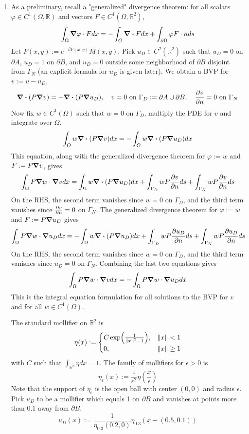 \documentclass{article}
\def\mbb#1{\mathbb{#1}}
\def\bR{\mbb{R}}
\newcommand{\br}[1]{\left(#1\right)}
\newcommand{\e}{\epsilon}
\newcommand{\vp}{\varphi}
\renewcommand{\d}{\partial}
\renewcommand{\O}{\Omega}
\newcommand{\G}{\Gamma}
\begin{document}
\begin{enumerate}
\begin{enumerate}
	
	\item As a preliminary, recall a "generalized" divergence theorem: for all scalars $\vp\in C^1(\O,\bR)$ and vectors $F\in C^1(\O,\bR^2)$,
	\[\int_\O\grad\vp\cdot Fdx = -\int_O\div Fdx + \int_{\d\O}\vp F\cdot nds\]
	Let $P(x,y):=e^{-\beta V(x,y)}M(x,y)$. Pick $u_D\in C^2(\bR^2)$ such that $u_D=0$ on $\d A$, $u_D=1$ on $\d B$, and $u_D=0$ outside some neighborhood of $\d B$ disjoint from $\G_N$ (an explicit formula for $u_D$ is given later). We obtain a BVP for $v:=u-u_D$,
	\[\div(P\grad v) = -\div(P\grad u_D),
	\quad v=0 \text{ on } \G_D:=\d A\cup\d B,
	\quad \pdv{v}{n}=0 \text{ on } \G_N\]
	Now fix $w\in C^1(\O)$ such that $w=0$ on $\G_D$, multiply the PDE for $v$ and integrate over $\O$.
	\[\int_O w\div(P\grad v)dx = -\int_O w\div(P\grad u_D)dx\]
	This equation, along with the generalized divergence theorem for $\vp:=w$ and $F:=P\grad v$, gives
	\[\int_\O P\grad w\cdot\grad vdx = \int_\O w\div(P\grad u_D)dx + \int_{\G_D} wP\pdv{v}{n}ds + \int_{\G_N} wP\pdv{v}{n}ds\]
	On the RHS, the second term vanishes since $w=0$ on $\G_D$, and the third term vanishes since $\pdv{v}{n}=0$ on $\G_N$. The generalized divergence theorem for $\vp:=w$ and $F:=P\grad u_D$ gives
	\[\int_\O P\grad w\cdot\grad u_Ddx = -\int_\O w\div(P\grad u_D)dx + \int_{\G_D} wP\pdv{u_D}{n}ds + \int_{\G_N} wP\pdv{u_D}{n}ds\]
	On the RHS, the second term vanishes since $w=0$ on $\G_D$, and the third term vanishes since $u_D=0$ on $\G_N$. Combining the last two equations gives
	\[\int_\O P\grad w\cdot\grad vdx = -\int_\O P\grad w\cdot\grad u_Ddx\]
	This is the integral equation formulation for all solutions to the BVP for $v$ and for all $w\in C^1(\O)$.
	
	The standard mollifier on $\bR^2$ is
	\[\eta(x) :=
	\begin{cases}
		C\exp(\frac{1}{\norm{x}^2-1}), & \norm{x} < 1 \\
		0, & \norm{x} \ge 1
	\end{cases}\]
	with $C$ such that $\int_{\bR^2}\eta dx=1$. The family of mollifiers for $\e>0$ is
	\[\eta_\e(x) := \frac{1}{\e^2}\eta\br{\frac x\e}\]
	Note that the support of $\eta_\e$ is the open ball with center $(0,0)$ and radius $\e$. Pick $u_D$ to be a mollifier which equals 1 on $\d B$ and vanishes at points more than 0.1 away from $\d B$.
	\[u_D(x) := \frac{1}{\eta_{0.3}(0.2,0)}\eta_{0.3}(x-(0.5,0.1))\]
	

\end{enumerate}
\end{enumerate}
\end{document}

